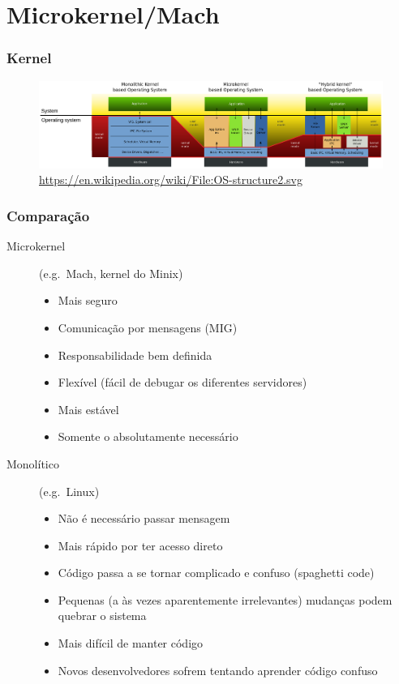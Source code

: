 \documentclass[10pt]{beamer}
\theoremstyle{plain}
\begin{document}
\section{Microkernel/Mach}

\begin{frame}
  \frametitle{Kernel}
  \begin{figure}[h]
    \hspace*{-0.9cm}
    \includegraphics[scale=0.235]{imgs/kernel.png}
    \caption{\url{https://en.wikipedia.org/wiki/File:OS-structure2.svg}}
  \end{figure}
\end{frame}

\begin{frame}
  \frametitle{Comparação}
  \begin{description}
    \item[Microkernel] (e.g.\ Mach, kernel do Minix)
      \begin{itemize}
        \item Mais seguro
        \item Comunicação por mensagens (MIG)
        \item Responsabilidade bem definida
        \item Flexível (fácil de debugar os diferentes servidores)
        \item Mais estável
        \item Somente o absolutamente necessário
      \end{itemize}
    \item[Monolítico] (e.g.\ Linux)
      \begin{itemize}
        \item Não é necessário passar mensagem
        \item Mais rápido por ter acesso direto
        \item Código passa a se tornar complicado e confuso (spaghetti code)
        \item Pequenas (a às vezes aparentemente irrelevantes) mudanças podem quebrar o sistema
        \item Mais difícil de manter código
        \item Novos desenvolvedores sofrem tentando aprender código confuso
      \end{itemize}
  \end{description}
\end{frame}
\end{document}
